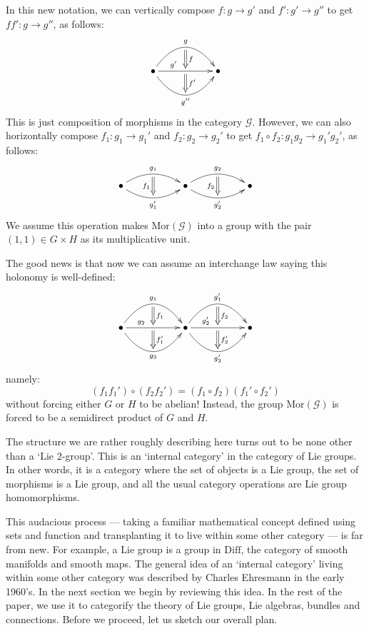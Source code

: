 \documentclass{article}
\newcommand{\maps}{\colon}
\newcommand{\Diff}{\mathrm{Diff}}
\newcommand{\Mor}{\mathrm{Mor}}
\def\twogroup {\mathcal{G}}
\begin{document}
In this new notation, we can vertically compose $f \maps g \to g'$ 
and $f' \maps g' \to g''$ to get $f f' \maps g \to g''$, as follows:
\[
\xymatrix{
   \bullet \ar@/^2pc/[rr]^{g}_{}="0"
           \ar[rr]^<<<<<<{g'}_{}="1"
           \ar@{=>}"0";"1"^{f}
           \ar@/_2pc/[rr]_{g''}_{}="2"
           \ar@{=>}"1";"2"^{f'}
&& \bullet
}
\]
This is just composition of morphisms in the category $\twogroup$.  However, 
we can also horizontally compose $f_1 \maps g_1 \to g_1'$ and $f_2 \maps
g_2 \to g_2'$ to get $f_1 \circ f_2 \maps g_1g_2 \to g_1'g_2'$, as follows:
\[
\xymatrix{
   \bullet \ar@/^1pc/[rr]^{g_1}_{}="0"
           \ar@/_1pc/[rr]_{g_1'}_{}="1"
           \ar@{=>}"0";"1"_{f_1}
&& \bullet \ar@/^1pc/[rr]^{g_2}_{}="2"
           \ar@/_1pc/[rr]_{g_2'}_{}="3"
           \ar@{=>}"2";"3"_{f_2}
&& \bullet
}
\]
We assume this operation makes $\Mor(\twogroup)$ into a 
group with the pair $(1,1) \in G \times H$ as its multiplicative unit.

The good news is that now we can assume an interchange law saying this
holonomy is well-defined:
\[
\xymatrix{
   \bullet \ar@/^2pc/[rr]^{g_1}_{}="0"
           \ar[rr]^<<<<<<{g_2}_{}="1"
           \ar@{=>}"0";"1"^{f_1}
           \ar@/_2pc/[rr]_{g_3}_{}="2"
           \ar@{=>}"1";"2"^{f_1'}
&& \bullet \ar@/^2pc/[rr]^{g_1'}_{}="3"
           \ar[rr]^<<<<<<{g_2'}_{}="4"
           \ar@{=>}"3";"4"^{f_2}
           \ar@/_2pc/[rr]_{g_3'}_{}="5"
           \ar@{=>}"4";"5"^{f_2'}
&& \bullet
}
\]
namely:
\[
  (f_1 f_1') \circ (f_2 f_2') =  (f_1 \circ f_2) (f_1' \circ f_2')
\]
without forcing either $G$ or $H$ to be abelian!   Instead, the group
$\Mor(\twogroup)$ is forced to be a semidirect product of $G$ and $H$.

The structure we are rather roughly describing here turns out to be
none other than a `Lie 2-group'.  This is an `internal category' in the
category of Lie groups.  In other words, it is a category where the set of 
objects is a Lie group, the set of morphisms is a Lie group, and all the 
usual category operations are Lie group homomorphisms. 

This audacious process --- taking a familiar 
mathematical concept defined using sets and function 
and transplanting it to live within some other category --- is far from new.  
For example, a Lie group is a group in $\Diff$, the category of smooth 
manifolds and smooth maps.  The general idea of an `internal category'
living within some other category was described by Charles Ehresmann 
\cite{Ehresmann:1963} in the early 1960's.  In the next section we begin 
by reviewing this idea.  In the rest of the paper, we use it to categorify 
the theory of Lie groups, Lie algebras, bundles and connections.  
Before we proceed, let us sketch our overall plan.
\end{document}
